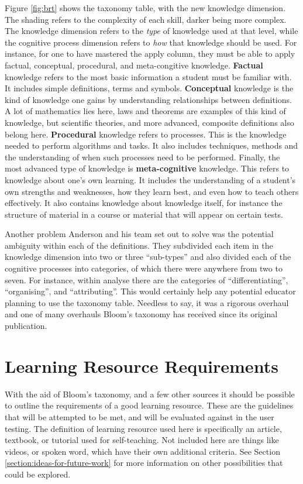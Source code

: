Figure \ref{fig:brt} shows the taxonomy table, with the new knowledge dimension. The shading refers to the complexity of each skill, darker being more complex. The knowledge dimension refers to the \textit{type} of knowledge used at that level, while the cognitive process dimension refers to \textit{how} that knowledge should be used. For instance, for one to have mastered the apply column, they must be able to apply factual, conceptual, procedural, and meta-congitive knowledge. \textbf{Factual} knowledge refers to the most basic information a student must be familiar with. It includes simple definitions, terms and symbols. \textbf{Conceptual} knowledge is the kind of knowledge one gains by understanding relationships between definitions. A lot of mathematics lies here, laws and theorems are examples of this kind of knowledge, but scientific theories, and more advanced, composite definitions also belong here. \textbf{Procedural} knowledge refers to processes. This is the knowledge needed to perform algorithms and tasks. It also includes techniques, methods and the understanding of when such processes need to be performed. Finally, the most advanced type of knowledge is \textbf{meta-cognitive} knowledge. This refers to knowledge about one's own learning. It includes the understanding of a student's own strengths and weaknesses, how they learn best, and even how to teach others effectively. It also contains knowledge about knowledge itself, for instance the structure of material in a course or material that will appear on certain tests.

Another problem Anderson and his team set out to solve was the potential ambiguity within each of the definitions. They subdivided each item in the knowledge dimension into two or three ``sub-types'' and also divided each of the cognitive processes into categories, of which there were anywhere from two to seven. For instance, within analyse there are the categories of ``differentiating'', ``organising'', and ``attributing''. This would certainly help any potential educator planning to use the taxonomy table. Needless to say, it was a rigorous overhaul and one of many overhauls Bloom's taxonomy has received since its original publication.

\section{Learning Resource Requirements} \label{section:learning-resource-requirements}

With the aid of Bloom's taxonomy, and a few other sources it should be possible to outline the requirements of a good learning resource. These are the guidelines that will be attempted to be met, and will be evaluated against in the user testing. The definition of learning resource used here is specifically an article, textbook, or tutorial used for self-teaching. Not included here are things like videos, or spoken word, which have their own additional criteria. See Section \ref{section:ideas-for-future-work} for more information on other possibilities that could be explored.

